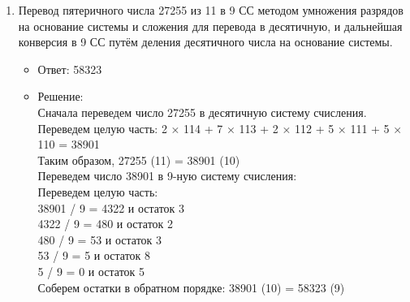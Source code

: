 \documentclass[14pt,final,oneside]{extreport}%
\begin{document}
\begin{enumerate}
        \item Перевод пятеричного числа 27255 из 11 в 9 СС методом умножения разрядов на основание системы и сложения для перевода в десятичную, и дальнейшая конверсия в 9 СС путём деления десятичного числа на основание системы.
        \begin{itemize}
            \item Ответ: 58323
            \item Решение: \\
                Сначала переведем число 27255 в десятичную систему счисления. \\
                Переведем целую часть: 2 × 114 + 7 × 113 + 2 × 112 + 5 × 111 + 5 × 	110 = 38901 \\
                Таким образом, 27255 (11) = 38901 (10) \\
                Переведем число 38901 в 9-ную систему счисления: \\ 
                Переведем целую часть: \\
                38901 / 9 = 4322 и остаток 3 \\
                4322 / 9 = 480 и остаток 2 \\
                480 / 9 = 53 и остаток 3 \\
                53 / 9 = 5 и остаток 8 \\
                5 / 9 = 0 и остаток 5 \\
                Соберем остатки в обратном порядке: 38901 (10) = 58323 (9)
        \end{itemize}


\end{enumerate}
\end{document}
